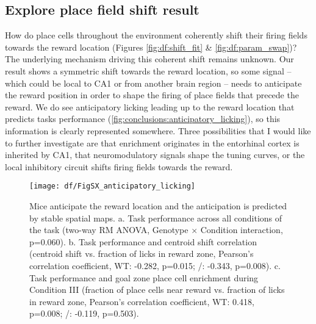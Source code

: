 \subsection{Explore place field shift result}
How do place cells throughout the environment coherently shift their firing fields towards the reward location (Figures \ref{fig:df:shift_fit} \& \ref{fig:df:param_swap})?
The underlying mechanism driving this coherent shift remains unknown.
Our result shows a symmetric shift towards the reward location, so some signal -- which could be local to CA1 or from another brain region -- needs to anticipate the reward position in order to shape the firing of place fields that precede the reward.
We do see anticipatory licking leading up to the reward location that predicts tasks performance (\autoref{fig:conclusions:anticipatory_licking}), so this information is clearly represented somewhere.
Three possibilities that I would like to further investigate are that enrichment originates in the entorhinal cortex is inherited by CA1, that neuromodulatory signals shape the tuning curves, or the local inhibitory circuit shifts firing fields towards the reward.
\begin{figure}
	\centering
	\texttt{[image: df/FigSX\_anticipatory\_licking]}
	\caption[Mice anticipate the reward location and the anticipation is predicted by stable spatial maps]{Mice anticipate the reward location and the anticipation is predicted by stable spatial maps. a. Task performance across all conditions of the task (two-way RM ANOVA, Genotype $\times$ Condition interaction, p=0.060).
	b. Task performance and centroid shift correlation (centroid shift vs. fraction of licks in reward zone, Pearson's correlation coefficient, WT: -0.282, p=0.015; \df/: -0.343, p=0.008).
	c. Task performance and goal zone place cell enrichment during Condition III (fraction of place cells near reward vs. fraction of licks in reward zone, Pearson's correlation coefficient, WT: 0.418, p=0.008; \df/: -0.119, p=0.503).}
	\label{fig:conclusions:anticipatory_licking}
\end{figure}


